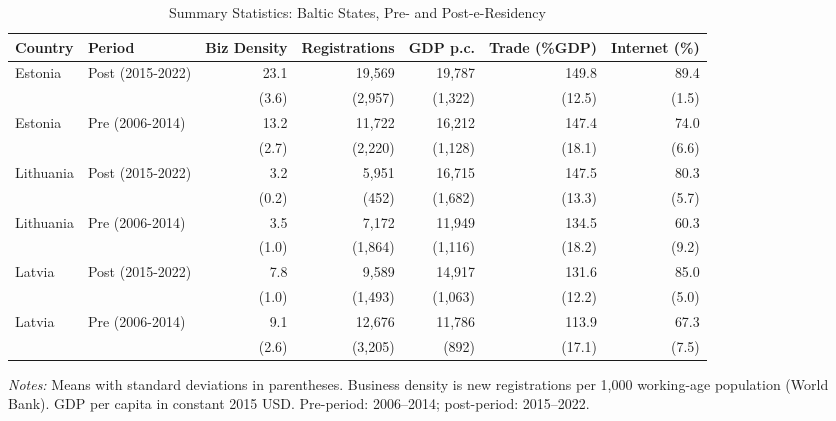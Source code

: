 \begin{table}[H]
\centering
\caption{Summary Statistics: Baltic States, Pre- and Post-e-Residency}
\label{tab:summary}
\begin{threeparttable}
\footnotesize
\begin{tabular}{llrrrrr}
\toprule
Country & Period & Biz Density & Registrations & GDP p.c. & Trade (\%GDP) & Internet (\%) \\
\midrule
Estonia & Post (2015-2022) & 23.1 & 19,569 & 19,787 & 149.8 & 89.4 \\
 & & (3.6) & (2,957) & (1,322) & (12.5) & (1.5) \\
Estonia & Pre (2006-2014) & 13.2 & 11,722 & 16,212 & 147.4 & 74.0 \\
 & & (2.7) & (2,220) & (1,128) & (18.1) & (6.6) \\
\midrule
Lithuania & Post (2015-2022) & 3.2 & 5,951 & 16,715 & 147.5 & 80.3 \\
 & & (0.2) & (452) & (1,682) & (13.3) & (5.7) \\
Lithuania & Pre (2006-2014) & 3.5 & 7,172 & 11,949 & 134.5 & 60.3 \\
 & & (1.0) & (1,864) & (1,116) & (18.2) & (9.2) \\
\midrule
Latvia & Post (2015-2022) & 7.8 & 9,589 & 14,917 & 131.6 & 85.0 \\
 & & (1.0) & (1,493) & (1,063) & (12.2) & (5.0) \\
Latvia & Pre (2006-2014) & 9.1 & 12,676 & 11,786 & 113.9 & 67.3 \\
 & & (2.6) & (3,205) & (892) & (17.1) & (7.5) \\
\bottomrule
\end{tabular}
\begin{tablenotes}[flushleft]\sloppy
\scriptsize
\item \textit{Notes:} Means with standard deviations in parentheses. Business density is new registrations per 1,000 working-age population (World Bank). GDP per capita in constant 2015 USD. Pre-period: 2006--2014; post-period: 2015--2022.
\end{tablenotes}
\end{threeparttable}
\end{table}
